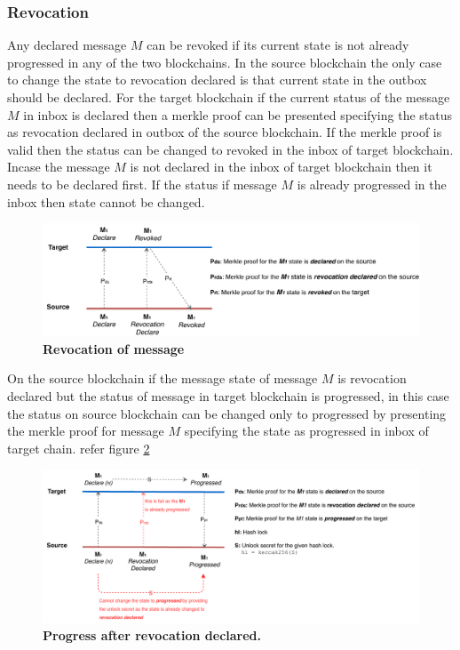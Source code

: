 \documentclass[12pt,a4paper]{article}
\begin{document}
\subsubsection{Revocation}\label{gateway:revocation}
Any declared message $M$ can be revoked if its current state is not already progressed in any of the two blockchains. 
In the source blockchain the only case to change the state to revocation declared is that current state in the outbox should be declared. 
For the target blockchain if the current status of the message $M$ in inbox is declared then a merkle proof can be presented specifying the status as revocation declared in outbox of the source blockchain. 
If the merkle proof is valid then the status can be changed to revoked in the inbox of target blockchain. 
Incase the message $M$ is not declared in the inbox of target blockchain then it needs to be declared first. 
If the status if message $M$ is already progressed in the inbox then state cannot be changed. 

\begin{figure}[htb]
    \centering
	\includegraphics[width=\textwidth]{revocation}
	\caption{\textbf{ Revocation of message}}
	\label{fig:revocation}
\end{figure}


On the source blockchain if the message state of message $M$ is revocation declared but the status of message in target blockchain is progressed, in this case the status on source blockchain can be changed only to progressed by presenting the merkle proof for message $M$ specifying the state as progressed in inbox of target chain. refer figure \ref{fig:revocation}
\begin{figure}[htb]
    \centering
	\includegraphics[width=\textwidth]{revocation_progress}
	\caption{\textbf{ Progress after revocation declared.}}
	\label{fig:revocation}
\end{figure}
\end{document}
